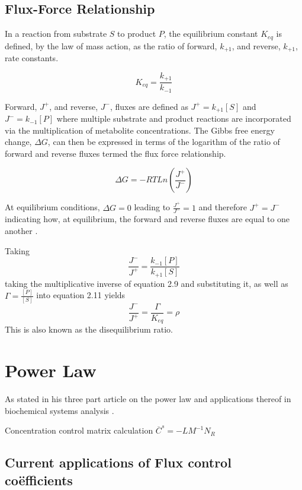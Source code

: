 \subsection{Flux-Force Relationship}
In a reaction from substrate $S$ to product $P$, the equilibrium constant $K_{eq}$ is defined, by the law of mass action, as the ratio of forward, $k_{+1}$, and reverse, $k_{+1}$, rate constants.

\begin{equation}
K_{eq}= \frac{k_{+1}}{k_{-1}}
\end{equation}

Forward, $J^+$, and reverse, $J^-$, fluxes are defined as $J^+ = k_{+1}[S]$ and $J^- = k_{-1}[P]$ where multiple substrate and product reactions are incorporated via the multiplication of metabolite concentrations.
The Gibbs free energy change, $\Delta G$, can then be expressed in terms of the logarithm of the ratio of forward and reverse fluxes termed the flux force relationship.

\begin{equation}
\Delta G = -RTLn(\frac{J^+}{J^-})
\end{equation}

At equilibrium conditions, $\Delta G = 0$ leading to $\frac{J^+}{J^-} = 1$ and therefore $J^+=J^-$ indicating how, at equilibrium, the forward and reverse fluxes are equal to one another \citep{Beard2007}. 

Taking 
\begin{equation}
\frac{J^-}{J^+} = \frac{k_{-1}[P]}{k_{+1}[S]}
\end{equation}
taking the multiplicative inverse of equation 2.9 and substituting it, as well as $\Gamma = \frac{[P]}{[S]}$ into equation 2.11 yields
\begin{equation}
\frac{J^-}{J^+} = \frac{\Gamma}{K_{eq}} = \rho
\end{equation}
 This is also known as the disequilibrium ratio.

\section{Power Law}
As stated in his three part article on the power law and applications thereof in biochemical systems analysis \cite{Savageau1969a,Savageau1969,Savageau1970}.

Concentration control matrix calculation
$\overline{C}^s=-LM^{-1}N_R$

\subsection{Current applications of Flux control co\"efficients}


